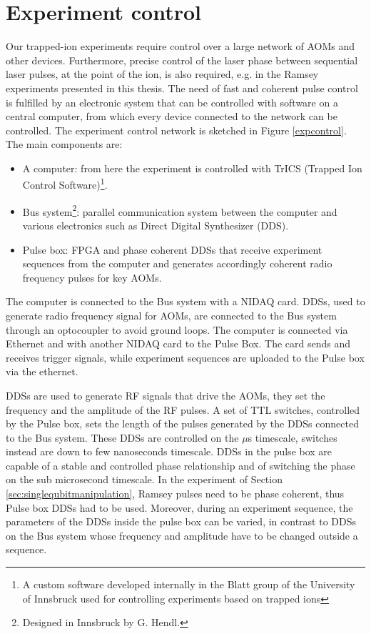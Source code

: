 \section{Experiment control}
\label{sec:expcontrol}
Our trapped-ion experiments require control over a large network of AOMs and other devices. Furthermore, precise control of the laser phase between sequential laser pulses, at the point of the ion, is also required, e.g. in the Ramsey experiments presented in this thesis. The need of fast and coherent pulse control is fulfilled by an electronic system that can be controlled with software on a central computer, from which every device connected to the network can be controlled. The experiment control network is sketched in Figure \ref{expcontrol}. The main components are:
\begin{itemize}
\item A computer: from here the experiment is controlled with TrICS (Trapped Ion Control Software)\footnote{A custom software developed internally in the Blatt  group of the University of Innsbruck used for controlling experiments based on trapped ions}.
\item Bus system\footnote{Designed in Innsbruck by G. Hendl.}: parallel communication system between the computer and various electronics such as Direct Digital Synthesizer (DDS).
\item Pulse box: FPGA and phase coherent DDSs that receive experiment sequences from the computer and generates accordingly coherent radio frequency pulses for key AOMs.
\end{itemize}
The computer is connected to the Bus system with a NIDAQ card. DDSs, used to generate radio frequency signal for AOMs, are connected to the Bus system through an optocoupler to avoid ground loops. The computer is connected via Ethernet and with another NIDAQ card to the Pulse Box. The card sends and receives trigger signals, while experiment sequences are uploaded to the Pulse box via the ethernet.\par
DDSs are used to generate RF signals that drive the AOMs, they set the frequency and the amplitude of the RF pulses. A set of TTL switches, controlled by the Pulse box, sets the length of the pulses generated by the DDSs connected to the Bus system. These DDSs are controlled on the $\mu$s timescale, switches instead are down to few nanoseconds timescale. DDSs in the pulse box are capable of a stable and controlled phase relationship and of switching the phase on the sub microsecond timescale. In the experiment of Section \ref{sec:singlequbitmanipulation}, Ramsey pulses need to be phase coherent, thus Pulse box DDSs had to be used. Moreover, during an experiment sequence, the parameters of the DDSs inside the pulse box can be varied, in contrast to DDSs on the Bus system whose frequency and amplitude have to be changed outside a sequence.\par
